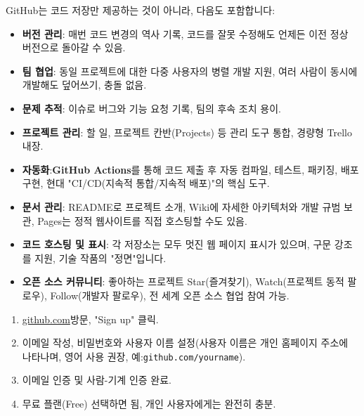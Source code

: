 
GitHub는 코드 저장만 제공하는 것이 아니라, 다음도 포함합니다:

\begin{itemize}
  \item \textbf{버전 관리}: 매번 코드 변경의 역사 기록, 코드를 잘못 수정해도 언제든 이전 정상 버전으로 돌아갈 수 있음.
  \item \textbf{팀 협업}: 동일 프로젝트에 대한 다중 사용자의 병렬 개발 지원, 여러 사람이 동시에 개발해도 덮어쓰기, 충돌 없음.
  \item \textbf{문제 추적}: 이슈로 버그와 기능 요청 기록, 팀의 후속 조치 용이.
  \item \textbf{프로젝트 관리}: 할 일, 프로젝트 칸반(Projects) 등 관리 도구 통합, 경량형 Trello 내장.
  \item \textbf{자동화}:\textbf{GitHub Actions}를 통해 코드 제출 후 자동 컴파일, 테스트, 패키징, 배포 구현, 현대 "CI/CD(지속적 통합/지속적 배포)"의 핵심 도구.
  \item \textbf{문서 관리}: README로 프로젝트 소개, Wiki에 자세한 아키텍처와 개발 규범 보관, Pages는 정적 웹사이트를 직접 호스팅할 수도 있음.
  \item \textbf{코드 호스팅 및 표시}: 각 저장소는 모두 멋진 웹 페이지 표시가 있으며, 구문 강조를 지원, 기술 작품의 "정면"입니다.
  \item \textbf{오픈 소스 커뮤니티}: 좋아하는 프로젝트 Star(즐겨찾기), Watch(프로젝트 동적 팔로우), Follow(개발자 팔로우), 전 세계 오픈 소스 협업 참여 가능.
\end{itemize}



\begin{enumerate}
  \item \href{https://github.com}{github.com}방문, "Sign up" 클릭.
  \item 이메일 작성, 비밀번호와 사용자 이름 설정(사용자 이름은 개인 홈페이지 주소에 나타나며, 영어 사용 권장, 예:\texttt{github.\allowbreak com/\allowbreak yourname}).
  \item 이메일 인증 및 사람-기계 인증 완료.
  \item 무료 플랜(Free) 선택하면 됨, 개인 사용자에게는 완전히 충분.
\end{enumerate}


